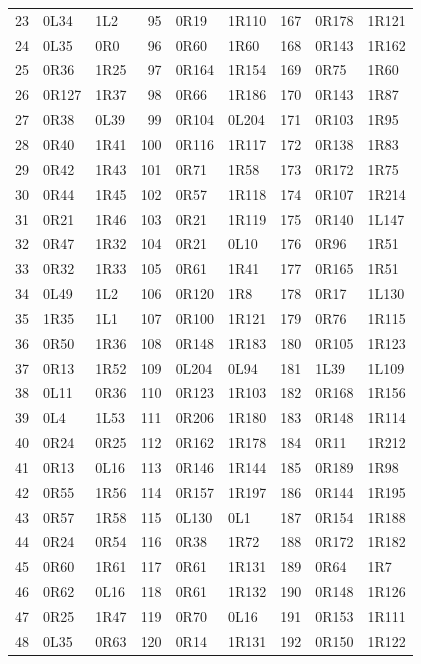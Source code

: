 \begin{longtable}{@{}rll@{\qquad}rll@{\qquad}rll@{}}
23 & 0L34 & 1L2 & 95 & 0R19 & 1R110 & 167 & 0R178 & 1R121\\
24 & 0L35 & 0R0 & 96 & 0R60 & 1R60 & 168 & 0R143 & 1R162\\
25 & 0R36 & 1R25 & 97 & 0R164 & 1R154 & 169 & 0R75 & 1R60\\
26 & 0R127 & 1R37 & 98 & 0R66 & 1R186 & 170 & 0R143 & 1R87\\
27 & 0R38 & 0L39 & 99 & 0R104 & 0L204 & 171 & 0R103 & 1R95\\
28 & 0R40 & 1R41 & 100 & 0R116 & 1R117 & 172 & 0R138 & 1R83\\
29 & 0R42 & 1R43 & 101 & 0R71 & 1R58 & 173 & 0R172 & 1R75\\
30 & 0R44 & 1R45 & 102 & 0R57 & 1R118 & 174 & 0R107 & 1R214\\
31 & 0R21 & 1R46 & 103 & 0R21 & 1R119 & 175 & 0R140 & 1L147\\
32 & 0R47 & 1R32 & 104 & 0R21 & 0L10 & 176 & 0R96 & 1R51\\
33 & 0R32 & 1R33 & 105 & 0R61 & 1R41 & 177 & 0R165 & 1R51\\
34 & 0L49 & 1L2 & 106 & 0R120 & 1R8 & 178 & 0R17 & 1L130\\
35 & 1R35 & 1L1 & 107 & 0R100 & 1R121 & 179 & 0R76 & 1R115\\
36 & 0R50 & 1R36 & 108 & 0R148 & 1R183 & 180 & 0R105 & 1R123\\
37 & 0R13 & 1R52 & 109 & 0L204 & 0L94 & 181 & 1L39 & 1L109\\
38 & 0L11 & 0R36 & 110 & 0R123 & 1R103 & 182 & 0R168 & 1R156\\
39 & 0L4 & 1L53 & 111 & 0R206 & 1R180 & 183 & 0R148 & 1R114\\
40 & 0R24 & 0R25 & 112 & 0R162 & 1R178 & 184 & 0R11 & 1R212\\
41 & 0R13 & 0L16 & 113 & 0R146 & 1R144 & 185 & 0R189 & 1R98\\
42 & 0R55 & 1R56 & 114 & 0R157 & 1R197 & 186 & 0R144 & 1R195\\
43 & 0R57 & 1R58 & 115 & 0L130 & 0L1 & 187 & 0R154 & 1R188\\
44 & 0R24 & 0R54 & 116 & 0R38 & 1R72 & 188 & 0R172 & 1R182\\
45 & 0R60 & 1R61 & 117 & 0R61 & 1R131 & 189 & 0R64 & 1R7\\
46 & 0R62 & 0L16 & 118 & 0R61 & 1R132 & 190 & 0R148 & 1R126\\
47 & 0R25 & 1R47 & 119 & 0R70 & 0L16 & 191 & 0R153 & 1R111\\
48 & 0L35 & 0R63 & 120 & 0R14 & 1R131 & 192 & 0R150 & 1R122\\

\end{longtable}
